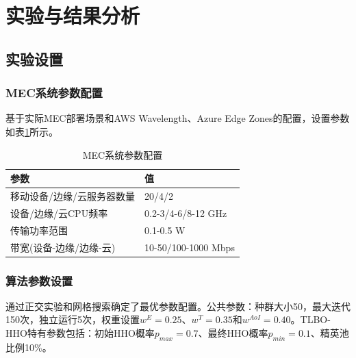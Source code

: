 \documentclass[conference]{IEEEtran}
\begin{document}
\section{实验与结果分析}
\subsection{实验设置}
\subsubsection{MEC系统参数配置}
基于实际MEC部署场景和AWS Wavelength、Azure Edge Zones的配置，设置参数如表\ref{tab:system}所示。

\begin{table}[H]
\small
\centering
\caption{MEC系统参数配置}
\label{tab:system}
\begin{tabular}{|l|l|}
\hline
参数 & 值 \\
\hline
移动设备/边缘/云服务器数量 & 20/4/2 \\
设备/边缘/云CPU频率 & 0.2-3/4-6/8-12 GHz \\
传输功率范围 & 0.1-0.5 W \\
带宽(设备-边缘/边缘-云) & 10-50/100-1000 Mbps \\
\hline
\end{tabular}
\end{table}

\begin{table}[H]
  \scriptsize
  \setlength{\tabcolsep}{4pt}
  \centering
  \caption{任务类型分布及其特征}
  \label{tab:task}

\end{table}

\subsubsection{算法参数设置}
通过正交实验和网格搜索确定了最优参数配置。公共参数：种群大小50，最大迭代150次，独立运行5次，权重设置$w^E = 0.25$、$w^T = 0.35$和$w^{AoI} = 0.40$。TLBO-HHO特有参数包括：初始HHO概率$p_{max} = 0.7$、最终HHO概率$p_{min} = 0.1$、精英池比例10\%。
\end{document}
